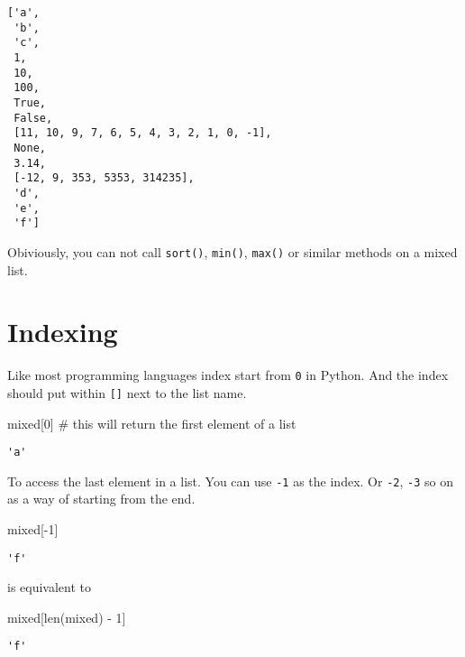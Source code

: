 \documentclass[
  letterpaper,
  DIV=11,
  numbers=noendperiod]{scrreprt}
\newenvironment{Shaded}{\begin{snugshade}}{\end{snugshade}}
\newcommand{\BuiltInTok}[1]{\textcolor[rgb]{0.00,0.23,0.31}{#1}}
\newcommand{\CommentTok}[1]{\textcolor[rgb]{0.37,0.37,0.37}{#1}}
\newcommand{\DecValTok}[1]{\textcolor[rgb]{0.68,0.00,0.00}{#1}}
\newcommand{\NormalTok}[1]{\textcolor[rgb]{0.00,0.23,0.31}{#1}}
\newcommand{\OperatorTok}[1]{\textcolor[rgb]{0.37,0.37,0.37}{#1}}
\begin{document}
\begin{verbatim}
['a',
 'b',
 'c',
 1,
 10,
 100,
 True,
 False,
 [11, 10, 9, 7, 6, 5, 4, 3, 2, 1, 0, -1],
 None,
 3.14,
 [-12, 9, 353, 5353, 314235],
 'd',
 'e',
 'f']
\end{verbatim}

Obiviously, you can not call \texttt{sort()}, \texttt{min()},
\texttt{max()} or similar methods on a mixed list.

\section{Indexing}\label{indexing}

Like most programming languages index start from \texttt{0} in Python.
And the index should put within \texttt{{[}{]}} next to the list name.

\begin{Shaded}
\begin{Highlighting}[]
\NormalTok{mixed[}\DecValTok{0}\NormalTok{] }\CommentTok{\# this will return the first element of a list }
\end{Highlighting}
\end{Shaded}

\begin{verbatim}
'a'
\end{verbatim}

To access the last element in a list. You can use \texttt{-1} as the
index. Or \texttt{-2}, \texttt{-3} so on as a way of starting from the
end.

\begin{Shaded}
\begin{Highlighting}[]
\NormalTok{mixed[}\OperatorTok{{-}}\DecValTok{1}\NormalTok{]}
\end{Highlighting}
\end{Shaded}

\begin{verbatim}
'f'
\end{verbatim}

is equivalent to

\begin{Shaded}
\begin{Highlighting}[]
\NormalTok{mixed[}\BuiltInTok{len}\NormalTok{(mixed) }\OperatorTok{{-}} \DecValTok{1}\NormalTok{]}
\end{Highlighting}
\end{Shaded}

\begin{verbatim}
'f'
\end{verbatim}
\end{document}
